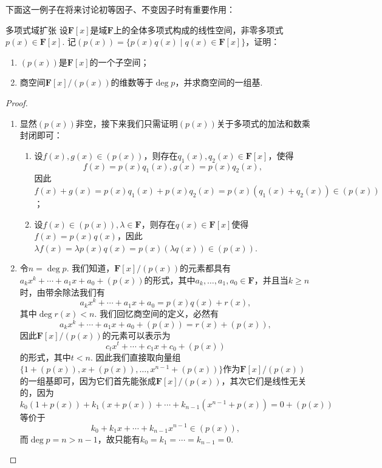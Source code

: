 下面这一例子在将来讨论初等因子、不变因子时有重要作用：
\begin{example}{}{多项式域扩张}
    设$\mathbf{F}[x]$是域$\mathbf{F}$上的全体多项式构成的线性空间，非零多项式$p(x)\in \mathbf{F}[x]$. 记$(p(x))=\{p(x)q(x)\mid q(x)\in \mathbf{F}[x]\}$，证明：
    \begin{enumerate}
        \item $(p(x))$是$\mathbf{F}[x]$的一个子空间；
        \item 商空间$\mathbf{F}[x]/(p(x))$的维数等于$\deg p$，并求商空间的一组基.
    \end{enumerate}
\end{example}
\begin{proof}
    \begin{enumerate}
        \item 显然$(p(x))$非空，接下来我们只需证明$(p(x))$关于多项式的加法和数乘封闭即可：
              \begin{enumerate}
                  \item 设$f(x),g(x)\in(p(x))$，则存在$q_1(x),q_2(x)\in\mathbf{F}[x]$，使得
                        \[f(x)=p(x)q_1(x),g(x)=p(x)q_2(x),\]
                        因此$f(x)+g(x)=p(x)q_1(x)+p(x)q_2(x)=p(x)(q_1(x)+q_2(x))\in(p(x))$；
                  \item 设$f(x)\in(p(x)),\lambda\in\mathbf{F}$，则存在$q(x)\in\mathbf{F}[x]$使得$f(x)=p(x)q(x)$，因此$\lambda f(x)=\lambda p(x)q(x)=p(x)(\lambda q(x))\in(p(x))$.
              \end{enumerate}
        \item 令$n=\deg p$. 我们知道，$\mathbf{F}[x]/(p(x))$的元素都具有$a_kx^k+\cdots+a_1x+a_0+(p(x))$的形式，其中$a_k,\ldots,a_1,a_0\in\mathbf{F}$，并且当$k\geqslant n$时，由带余除法我们有
              \[a_kx^k+\cdots+a_1x+a_0=p(x)q(x)+r(x),\]
              其中$\deg r(x)<n$. 我们回忆商空间的定义，必然有
              \[a_kx^k+\cdots+a_1x+a_0+(p(x))=r(x)+(p(x)),\]
              因此$\mathbf{F}[x]/(p(x))$的元素可以表示为
              \[c_tx^t+\cdots+c_1x+c_0+(p(x))\]
              的形式，其中$t<n$. 因此我们直接取向量组$\{1+(p(x)),x+(p(x)),\ldots,x^{n-1}+(p(x))\}$作为$\mathbf{F}[x]/(p(x))$的一组基即可，因为它们首先能张成$\mathbf{F}[x]/(p(x))$，其次它们是线性无关的，因为
              \[k_0(1+p(x))+k_1(x+p(x))+\cdots+k_{n-1}(x^{n-1}+p(x))=0+(p(x))\]
              等价于
              \[k_0+k_1x+\cdots+k_{n-1}x^{n-1}\in(p(x)),\]
              而$\deg p=n>n-1$，故只能有$k_0=k_1=\cdots=k_{n-1}=0$.
    \end{enumerate}
\end{proof}

